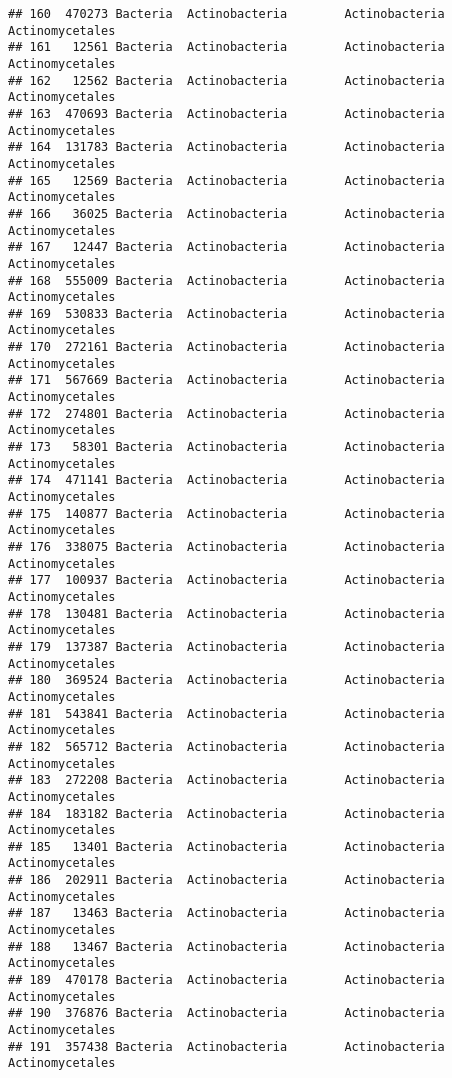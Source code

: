 \documentclass[
]{article}
\begin{document}
\begin{verbatim}
## 160  470273 Bacteria  Actinobacteria        Actinobacteria     Actinomycetales
## 161   12561 Bacteria  Actinobacteria        Actinobacteria     Actinomycetales
## 162   12562 Bacteria  Actinobacteria        Actinobacteria     Actinomycetales
## 163  470693 Bacteria  Actinobacteria        Actinobacteria     Actinomycetales
## 164  131783 Bacteria  Actinobacteria        Actinobacteria     Actinomycetales
## 165   12569 Bacteria  Actinobacteria        Actinobacteria     Actinomycetales
## 166   36025 Bacteria  Actinobacteria        Actinobacteria     Actinomycetales
## 167   12447 Bacteria  Actinobacteria        Actinobacteria     Actinomycetales
## 168  555009 Bacteria  Actinobacteria        Actinobacteria     Actinomycetales
## 169  530833 Bacteria  Actinobacteria        Actinobacteria     Actinomycetales
## 170  272161 Bacteria  Actinobacteria        Actinobacteria     Actinomycetales
## 171  567669 Bacteria  Actinobacteria        Actinobacteria     Actinomycetales
## 172  274801 Bacteria  Actinobacteria        Actinobacteria     Actinomycetales
## 173   58301 Bacteria  Actinobacteria        Actinobacteria     Actinomycetales
## 174  471141 Bacteria  Actinobacteria        Actinobacteria     Actinomycetales
## 175  140877 Bacteria  Actinobacteria        Actinobacteria     Actinomycetales
## 176  338075 Bacteria  Actinobacteria        Actinobacteria     Actinomycetales
## 177  100937 Bacteria  Actinobacteria        Actinobacteria     Actinomycetales
## 178  130481 Bacteria  Actinobacteria        Actinobacteria     Actinomycetales
## 179  137387 Bacteria  Actinobacteria        Actinobacteria     Actinomycetales
## 180  369524 Bacteria  Actinobacteria        Actinobacteria     Actinomycetales
## 181  543841 Bacteria  Actinobacteria        Actinobacteria     Actinomycetales
## 182  565712 Bacteria  Actinobacteria        Actinobacteria     Actinomycetales
## 183  272208 Bacteria  Actinobacteria        Actinobacteria     Actinomycetales
## 184  183182 Bacteria  Actinobacteria        Actinobacteria     Actinomycetales
## 185   13401 Bacteria  Actinobacteria        Actinobacteria     Actinomycetales
## 186  202911 Bacteria  Actinobacteria        Actinobacteria     Actinomycetales
## 187   13463 Bacteria  Actinobacteria        Actinobacteria     Actinomycetales
## 188   13467 Bacteria  Actinobacteria        Actinobacteria     Actinomycetales
## 189  470178 Bacteria  Actinobacteria        Actinobacteria     Actinomycetales
## 190  376876 Bacteria  Actinobacteria        Actinobacteria     Actinomycetales
## 191  357438 Bacteria  Actinobacteria        Actinobacteria     Actinomycetales

\end{verbatim}
\end{document}
